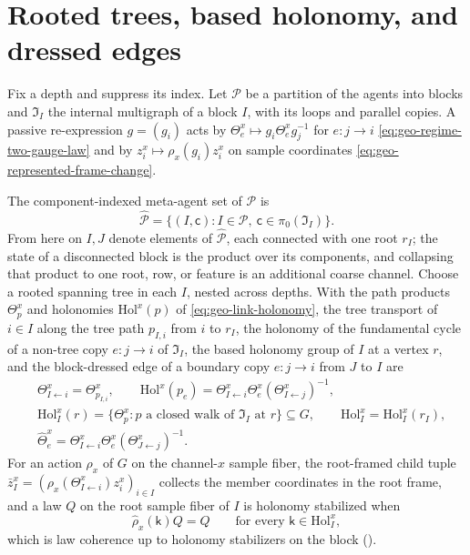 \section{Rooted trees, based holonomy, and dressed edges}
\label{sec:rg-gauge-cross-scale}

Fix a depth and suppress its index. Let $\mathcal P$ be a partition of the agents into blocks and
$\mathfrak I_I$ the internal multigraph of a block $I$, with its loops and parallel copies. A passive
re-expression $g=(g_i)$ acts by $\Theta^x_e\mapsto g_i\Theta^x_eg_j^{-1}$ for $e:j\to i$
\eqref{eq:geo-regime-two-gauge-law} and by $z^x_i\mapsto\rho_x(g_i)z^x_i$ on sample coordinates
\eqref{eq:geo-represented-frame-change}.

The component-indexed meta-agent set of $\mathcal P$ is
\begin{equation}
\widehat{\mathcal P}=\{(I,\mathsf c):I\in\mathcal P,\ \mathsf c\in\pi_0(\mathfrak I_I)\}.
\label{eq:rg-component-meta-index}
\end{equation}
From here on $I,J$ denote elements of $\widehat{\mathcal P}$, each connected with one root $r_I$; the state
of a disconnected block is the product over its components, and collapsing that product to one root, row,
or feature is an additional coarse channel. Choose a rooted spanning tree in each $I$, nested across
depths. With the path products $\Theta^x_p$ and holonomies $\mathrm{Hol}^x(p)$ of
\eqref{eq:geo-link-holonomy}, the tree transport of $i\in I$ along the tree path $p_{I,i}$ from $i$ to
$r_I$, the holonomy of the fundamental cycle of a non-tree copy $e:j\to i$ of $\mathfrak I_I$, the based
holonomy group of $I$ at a vertex $r$, and the block-dressed edge of a boundary copy $e:j\to i$ from $J$ to
$I$ are
\begin{align}
&\Theta^x_{I\leftarrow i}=\Theta^x_{p_{I,i}},
\qquad
\mathrm{Hol}^x(p_e)=\Theta^x_{I\leftarrow i}\Theta^x_e(\Theta^x_{I\leftarrow j})^{-1},
\label{eq:full-graph-tree-transport-law}\\
&\mathrm{Hol}^x_I(r)=\{\Theta^x_p:p\text{ a closed walk of }\mathfrak I_I\text{ at }r\}\subseteq G,
\qquad\mathrm{Hol}^x_I=\mathrm{Hol}^x_I(r_I),
\label{eq:full-graph-based-holonomy}\\
&\widehat\Theta^x_e=\Theta^x_{I\leftarrow i}\Theta^x_e(\Theta^x_{J\leftarrow j})^{-1}.
\label{eq:full-graph-dressed-edge}
\end{align}
For an action $\rho_x$ of $G$ on the channel-$x$ sample fiber, the root-framed child tuple
$\bar z^x_I=(\rho_x(\Theta^x_{I\leftarrow i})z^x_i)_{i\in I}$ collects the member coordinates in the root
frame, and a law $Q$ on the root sample fiber of $I$ is holonomy stabilized when
\begin{equation}
\widehat\rho_x(\mathsf k)Q=Q\qquad\text{for every }\mathsf k\in\mathrm{Hol}^x_I,
\label{eq:full-graph-holonomy-stabilization}
\end{equation}
which is law coherence up to holonomy stabilizers on the block ().

